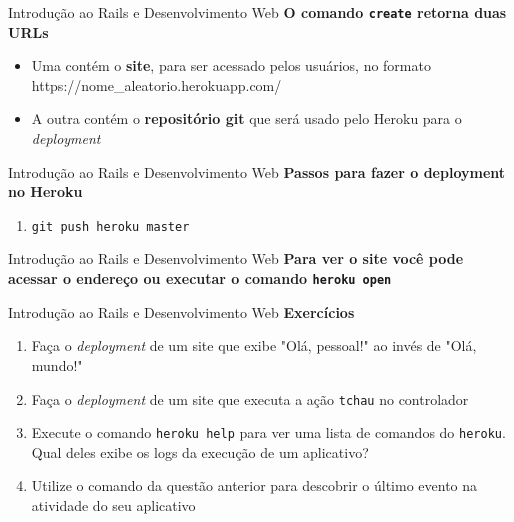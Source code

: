 \documentclass[10pt]{beamer}
\begin{document}
\begin{frame}{Introdução ao Rails e Desenvolvimento Web}
  \huge
  \textbf{O comando \texttt{create} retorna duas URLs}

  \vfill
  \Large
  \begin{itemize}
    \item Uma contém o \textbf{site}, para ser acessado pelos usuários, no formato https://nome\_aleatorio.herokuapp.com/
    \item A outra contém o \textbf{repositório git} que será usado pelo Heroku para o \textit{deployment}
  \end{itemize}
\end{frame}

\begin{frame}{Introdução ao Rails e Desenvolvimento Web}
  \huge
  \textbf{Passos para fazer o \textbf{deployment} no Heroku}
  \vfill
  \begin{enumerate}
    \item \texttt{git push heroku master}
  \end{enumerate}
\end{frame}

\begin{frame}{Introdução ao Rails e Desenvolvimento Web}
  \huge
  \textbf{Para ver o site você pode acessar o endereço ou executar o comando \texttt{heroku open}}
\end{frame}

\begin{frame}{Introdução ao Rails e Desenvolvimento Web}
  \huge
  \textbf{Exercícios}
  \vfill
  \large
  \begin{enumerate}
    \item Faça o \textit{deployment} de um site que exibe "Olá, pessoal!" ao invés de "Olá, mundo!"
    \item Faça o \textit{deployment} de um site que executa a ação \texttt{tchau} no controlador
    \item Execute o comando \texttt{heroku help} para ver uma lista de comandos do \texttt{heroku}. Qual deles exibe os logs da execução de um aplicativo?
    \item Utilize o comando da questão anterior para descobrir o último evento na atividade do seu aplicativo
  \end{enumerate}
\end{frame}
\end{document}

